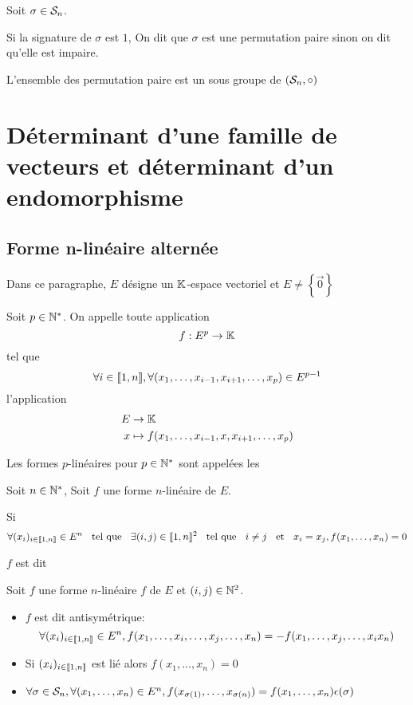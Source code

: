 \begin{dfn}
  Soit $\sigma \in \mathcal{S}_n$.

  Si la signature de $\sigma$ est $1$, On dit que $\sigma$ est une permutation paire sinon on dit
  qu'elle est impaire.

  L'ensemble des permutation paire est un sous groupe de $(\mathcal{S}_n, \circ)$
\end{dfn}

\section{Déterminant d'une famille de vecteurs et déterminant d'un endomorphisme}

\subsection{Forme n-linéaire alternée}

Dans ce paragraphe, $E$ désigne un $\mathbb{K}$-espace vectoriel et $E \neq \left\{ \vec{0} \right\}$

\begin{dfn}
  Soit $p \in \mathbb{N}^*$. On appelle  toute application
  \[
    f : E^p \to \mathbb{K}
  \]
  tel que
  \[
    \forall i \in \llbracket 1, n \rrbracket, \forall (x_1, \ldots, x_{i - 1}, x_{i + 1}, \ldots, x_p) \in E^{p - 1}
  \]
  l'application
  \begin{align*}
    E &\to \mathbb{K} \\
    x &\mapsto f(x_1, \ldots, x_{i - 1}, x, x_{i + 1}, \ldots, x_p)
  \end{align*}

  Les formes $p$-linéaires pour $p \in \mathbb{N}^*$ sont appelées les 
\end{dfn}

\begin{dfn}
  Soit $n \in \mathbb{N}^*$, Soit $f$ une forme $n$-linéaire de $E$.

  Si
  \[
      \forall (x_i)_{i \in \llbracket 1, n \rrbracket} \in E^n \;\;\text{ tel que }\;\; 
    \exists (i, j) \in \llbracket 1, n \rrbracket^2 \;\;\text{ tel que }\;\; i \neq j \;\;\text{ et }\;\; x_i = x_j,
    f(x_1, \ldots, x_n) = 0 
  \]
  
  $f$ est dit 
\end{dfn}

\begin{prp}
  Soit $f$ une forme $n$-linéaire $f$ de $E$ et $(i, j) \in \mathbb{N}^2$.

  \begin{itemize}
    \item $f$ est dit antisymétrique:
      \[
        \forall (x_i)_{i \in \llbracket 1, n \rrbracket} \in E^n,
        f(x_1, \ldots, x_i, \ldots, x_j, \ldots, x_n) = 
        - f(x_1, \ldots, x_j, \ldots, x_i x_n)
      \]
    \item Si $(x_i)_{i \in \llbracket 1, n \rrbracket}$ est lié alors
      $f(x_1, \ldots, x_n) = 0$
    \item $\forall \sigma \in \mathcal{S}_n, \forall (x_1, \ldots, x_n) \in E^n,
      f(x_{\sigma(1)}, \ldots, x_{\sigma(n)}) = f(x_1, \ldots, x_n) \epsilon(\sigma)$
  \end{itemize}
\end{prp}

